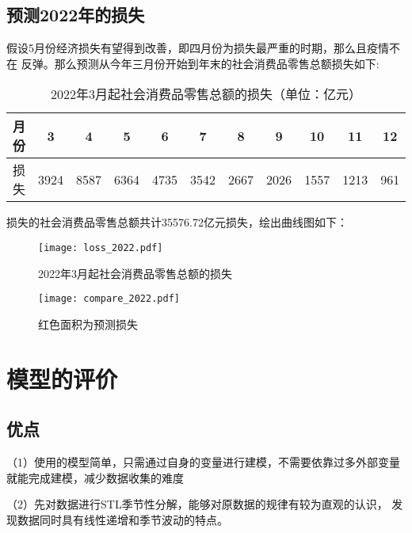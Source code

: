 \documentclass[12pt,a4paper]{nmmcm}
\begin{document}
  \subsection{预测2022年的损失}
  假设5月份经济损失有望得到改善，即四月份为损失最严重的时期，那么且疫情不在
  反弹。那么预测从今年三月份开始到年末的社会消费品零售总额损失如下:
  \begin{table}[H]
    \centering
    \caption{2022年3月起社会消费品零售总额的损失（单位：亿元）}
      \begin{tabular}{ccccccccccc}
      月份    & 3     & 4     & 5     & 6     & 7     & 8     & 9     & 10    & 11    & 12 \\
      \hline
      损失    & 3924 & 8587 & 6364 & 4735 & 3542 & 2667 & 2026 & 1557 & 1213 & 961 \\
      \end{tabular}%
    \label{loss_2020_table}%
  \end{table}%
  损失的社会消费品零售总额共计35576.72亿元损失，绘出曲线图如下：\nocite{yandou}
  \begin{figure}[H] %
    \centering %
    \begin{minipage}[t]{0.4\textwidth}
      \centering
      \texttt{[image: loss\_2022.pdf]} %
      \caption{2022年3月起社会消费品零售总额的损失} %
      \label{loss_2022} %
    \end{minipage}
    \begin{minipage}[t]{0.4\textwidth}
      \centering %
      \texttt{[image: compare\_2022.pdf]} %
      \caption{红色面积为预测损失} %
      \label{compare_2022} %
    \end{minipage}
  \end{figure} 
  \section{模型的评价}
  \subsection{优点}
  （1）使用的模型简单，只需通过自身的变量进行建模，不需要依靠过多外部变量
  就能完成建模，减少数据收集的难度

  （2）先对数据进行STL季节性分解，能够对原数据的规律有较为直观的认识，
  发现数据同时具有线性递增和季节波动的特点。
\end{document}

